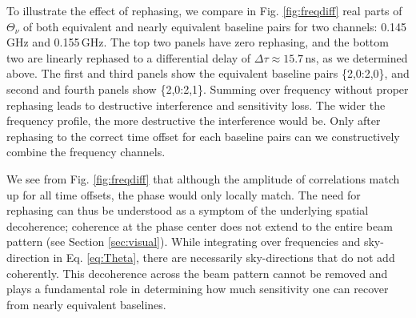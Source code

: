 \documentclass[twocolumn,apj,numberedappendix]{emulateapj}
\renewcommand\[{\begin{equation}}
\renewcommand\]{\end{equation}}
\begin{document}
To illustrate the effect of rephasing, we compare in Fig. \ref{fig:freqdiff} real parts of $\Theta_{\nu}$ of both equivalent and nearly equivalent baseline pairs for two channels: 0.145\,GHz and 0.155\,GHz. The top two panels have zero rephasing, and the bottom two are linearly rephased to a differential delay of $\Delta\tau\approx15.7$\,ns, as we determined above. The first and third panels show the equivalent baseline pairs \{2,0:2,0\}, and second and fourth panels show \{2,0:2,1\}. Summing over frequency without proper rephasing leads to destructive interference and sensitivity loss. The wider the frequency profile, the more destructive the interference would be. Only after rephasing to the correct time offset for each baseline pairs can we constructively combine the frequency channels. 

We see from Fig. \ref{fig:freqdiff} that although the amplitude of correlations match up for all time offsets, the phase would only locally match. The need for rephasing can thus be understood as a symptom of the underlying spatial decoherence; coherence at the phase center does not extend to the entire beam pattern (see Section \ref{sec:visual}). While integrating over frequencies and sky-direction in Eq. \eqref{eq:Theta}, there are necessarily sky-directions that do not add coherently. This decoherence across the beam pattern cannot be removed and plays a fundamental role in determining how much sensitivity one can recover from nearly equivalent baselines. 
\end{document}
